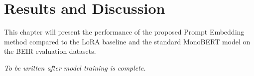 \chapter{Results and Discussion}
\label{ch:results}

This chapter will present the performance of the proposed Prompt Embedding method compared to the LoRA baseline and the standard MonoBERT model on the BEIR evaluation datasets.

\textit{To be written after model training is complete.}
